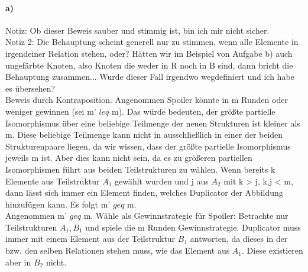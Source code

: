 \documentclass[12pt]{article}
\begin{document}
 \paragraph{a)}
 Notiz: Ob dieser Beweis sauber und stimmig ist, bin ich mir nicht sicher. \\
 Notiz 2: Die Behauptung scheint generell nur zu stimmen, wenn alle Elemente in irgendeiner Relation stehen, oder? Hätten wir im Beispiel von Aufgabe b) auch ungefärbte Knoten, also Knoten die weder in R noch in B sind, dann bricht die Behauptung zusammen... Wurde dieser Fall irgendwo wegdefiniert und ich habe es übersehen?\\
 Beweis durch Kontraposition. Angenommen Spoiler könnte in m Runden oder weniger gewinnen (sei m' $leq$ m). Das würde bedeuten, der größte partielle Isomorphismus über eine beliebige Teilmenge der neuen Strukturen ist kleiner als m. Diese beliebige Teilmenge kann nicht in ausschließlich in einer der beiden Strukturenpaare liegen, da wir wissen, dass der größte partielle Isomorphismus jeweils m ist. Aber dies kann nicht sein, da es zu größeren partiellen Isomorphismen führt aus beiden Teilstrukturen zu wählen. Wenn bereits k Elemente aus Teilstruktur $A_1$ gewählt wurden und j aus $A_2$ mit k > j, k,j < m, dann lässt sich immer ein Element finden, welches Duplicator der Abbildung hinzufügen kann. Es folgt m' $geq$ m.\\
Angenommen m' $geq$ m. Wähle als Gewinnstrategie für Spoiler: Betrachte nur Teilstrukturen $A_1,B_1$ und spiele die m Runden Gewinnstrategie. Duplicator muss immer mit einem Element aus der Teilstruktur $B_1$ antworten, da dieses in der bzw. den selben Relationen stehen muss, wie das Element aus $A_1$. Diese existieren aber in $B_2$ nicht.
  
\end{document}
